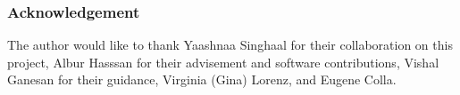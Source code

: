 \begin{frame}
  \frametitle{Acknowledgement}
        The author would like to thank Yaashnaa Singhaal for 
        their collaboration on this project, Albur Hasssan 
        for their advisement and software contributions, 
        Vishal Ganesan for their guidance, Virginia (Gina) 
        Lorenz, and Eugene Colla.
\end{frame}

